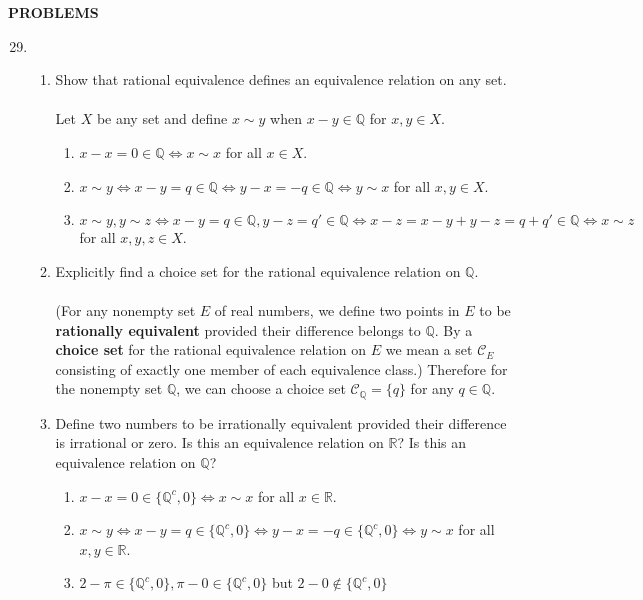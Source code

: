\begin{center}
	\textbf{PROBLEMS}
\end{center}
\begin{enumerate}
	\setcounter{enumi}{28}
	\item 
	\begin{enumerate}[label=(\roman*),align=left]
		\item Show that rational equivalence defines an equivalence relation on any set.\\
		\\Let $X$ be any set and define $x\sim y$ when $x-y\in\mathbb{Q}$ for $x,y\in X$.
		\begin{enumerate}
			\item $x-x=0\in\mathbb{Q}\iff x\sim x$ for all $x\in X$.
			\item $x\sim y \iff x-y=q \in\mathbb{Q}\iff y-x=-q\in\mathbb{Q}\iff y\sim x$ for all $x,y\in X$.
			\item $x\sim y,y\sim z \iff x-y=q\in\mathbb{Q},y-z=q'\in\mathbb{Q}\iff x-z=x-y+y-z=q+q'\in\mathbb{Q}\iff x\sim z$ for all $x,y,z\in X$.
		\end{enumerate}
		\item Explicitly find a choice set for the rational equivalence relation on $\mathbb{Q}$.\\
		\\(For any nonempty set $E$ of real numbers, we define two points in $E$ to be \textbf{rationally equivalent} provided their difference belongs to $\mathbb{Q}$. By a \textbf{choice set} for the rational equivalence relation on $E$ we mean a set $\mathcal{C}_E$ consisting of exactly one member of each equivalence class.)
		Therefore for the nonempty set $\mathbb{Q}$, we can choose a choice set $\mathcal{C}_{\mathbb{Q}}=\{q\}$ for any $q\in\mathbb{Q}$.
		\item Define two numbers to be irrationally equivalent provided their difference is irrational or zero. Is this an equivalence relation on $\mathbb{R}$? Is this an equivalence relation on $\mathbb{Q}$?\\
		\begin{enumerate}
			\item $x-x=0\in\{\mathbb{Q}^c,0\}\iff x\sim x$ for all $x\in \mathbb{R}$.
			\item $x\sim y \iff x-y=q \in\{\mathbb{Q}^c,0\}\iff y-x=-q\in\{\mathbb{Q}^c,0\}\iff y\sim x$ for all $x,y\in \mathbb{R}$.
			\item $2-\pi\in\{\mathbb{Q}^c,0\},\pi-0\in\{\mathbb{Q}^c,0\}$ but $2-0\notin\{\mathbb{Q}^c,0\}$

\end{enumerate}
\end{enumerate}
\end{enumerate}
